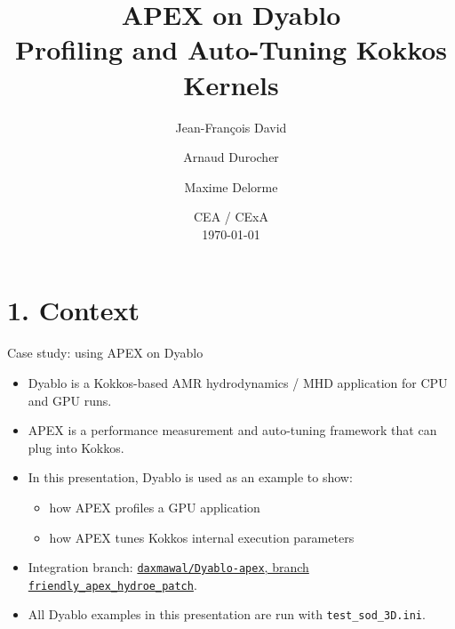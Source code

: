 \documentclass[11pt]{beamer}
\title[APEX @ Dyablo]{APEX on Dyablo\\Profiling and Auto-Tuning Kokkos Kernels}
\author[David, Durocher, Delorme]{Jean-François David \and Arnaud Durocher \and Maxime Delorme}
\date{CEA / CExA\\\today}
\newcommand{\dyablo}{Dyablo}
\begin{document}
\begin{frame}
  \titlepage
\end{frame}

\section{1. Context}

\begin{frame}[t]{Case study: using APEX on Dyablo}
\small
\begin{itemize}\itemsep0.4em
    \item Dyablo is a Kokkos-based AMR hydrodynamics / MHD application for CPU and GPU runs.
    \item APEX is a performance measurement and auto-tuning framework that can plug into Kokkos.
    \item In this presentation, \dyablo{} is used as an example to show:
    \begin{itemize}\itemsep0.2em
        \item how APEX profiles a GPU application
        \item how APEX tunes Kokkos internal execution parameters
    \end{itemize}
    \item Integration branch: \href{https://github.com/daxmawal/Dyablo-apex/tree/scratch_test_sod_3d_max_lvl7}{\texttt{daxmawal/Dyablo-apex}, branch \texttt{friendly\_apex\_hydroe\_patch}}.
    \item All Dyablo examples in this presentation are run with \texttt{test\_sod\_3D.ini}.
\end{itemize}
\end{frame}
\end{document}

